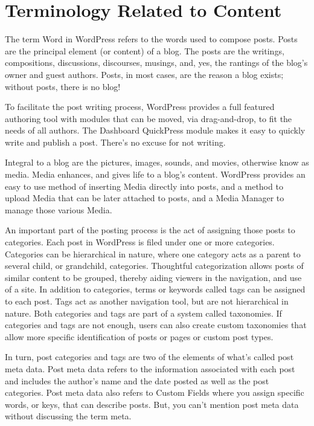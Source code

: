\section{Terminology Related to Content}

The term Word in WordPress refers to the words used to compose posts. Posts are the principal element (or content) of a blog. The posts are the writings, compositions, discussions, discourses, musings, and, yes, the rantings of the blog's owner and guest authors. Posts, in most cases, are the reason a blog exists; without posts, there is no blog!

To facilitate the post writing process, WordPress provides a full featured authoring tool with modules that can be moved, via drag-and-drop, to fit the needs of all authors. The Dashboard QuickPress module makes it easy to quickly write and publish a post. There's no excuse for not writing.

Integral to a blog are the pictures, images, sounds, and movies, otherwise know as media. Media enhances, and gives life to a blog's content. WordPress provides an easy to use method of inserting Media directly into posts, and a method to upload Media that can be later attached to posts, and a Media Manager to manage those various Media.

An important part of the posting process is the act of assigning those posts to categories. Each post in WordPress is filed under one or more categories. Categories can be hierarchical in nature, where one category acts as a parent to several child, or grandchild, categories. Thoughtful categorization allows posts of similar content to be grouped, thereby aiding viewers in the navigation, and use of a site. In addition to categories, terms or keywords called tags can be assigned to each post. Tags act as another navigation tool, but are not hierarchical in nature. Both categories and tags are part of a system called taxonomies. If categories and tags are not enough, users can also create custom taxonomies that allow more specific identification of posts or pages or custom post types.

In turn, post categories and tags are two of the elements of what's called post meta data. Post meta data refers to the information associated with each post and includes the author's name and the date posted as well as the post categories. Post meta data also refers to Custom Fields where you assign specific words, or keys, that can describe posts. But, you can't mention post meta data without discussing the term meta.

